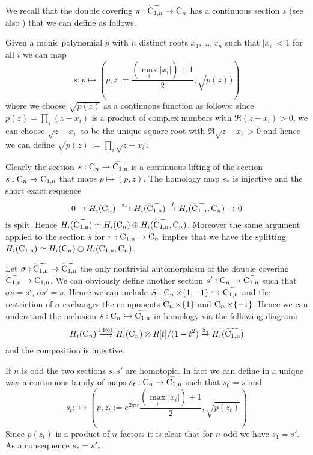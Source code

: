 




We recall that the double covering $\pi: \widetilde{\operatorname{C_{1,n}}} \to \operatorname{C}_n$ has a continuous section $s$  (see also \cite[p. 30]{bianchi}) that we can define as follows.
\begin{df} \label{def:section}
Given a monic polynomial $p$ with $n$ distinct roots $x_1, \ldots, x_n$ such that $|x_i| <1$ for all $i$ we can map
$$s: p \mapsto \left(p, z:= \frac{(\max_i |x_i|) +1}{2}, \sqrt{p(z)}) \right)$$
where we choose $\sqrt{p(z)}$ as a continuous function as follows: since $p(z) = \prod_i(z-x_i)$ is a product of complex numbers with $\Re (z-x_i) >0$, we can choose $\sqrt{z-x_i}$ to be the unique square root with $\Re \sqrt{z-x_i} >0$ and hence we can define $\sqrt{p(z)} := \prod_i \sqrt{z-x_i}$.
\end{df}
Clearly the section $s:\operatorname{C}_n \to \widetilde{\operatorname{C_{1,n}}}$ is a continuous lifting of the section  $\overline{s}:\operatorname{C}_n \to \operatorname{C_{1,n}}$ that maps $p \mapsto (p, z)$.
The homology map $s_*$ is injective and the short exact sequence
$$
0 \to H_i(\operatorname{C}_n) \stackrel{s_*}{\longrightarrow} H_i(\widetilde{\operatorname{C_{1,n}}}) \stackrel{J}{\to} H_i(\widetilde{\operatorname{C_{1,n}}}, \operatorname{C}_n) \to 0
$$
is split. Hence $H_i(\widetilde{\operatorname{C_{1,n}}}) \simeq H_i(\operatorname{C}_n) \oplus H_i(\widetilde{\operatorname{C_{1,n}}}, \operatorname{C}_n)$.
Moreover the same argument applied to the section $\overline{s}$ for $\pi: \operatorname{C_{1,n}} \to \operatorname{C}_n$ implies that we have the splitting $H_i(\operatorname{C_{1,n}}) \simeq H_i(\operatorname{C}_n) \oplus H_i(\operatorname{C_{1,n}}, \operatorname{C}_n)$.	

\begin{rem}\label{rem:Cn_sections}
Let $\sigma: \widetilde{\operatorname{C_{1,n}}} \to \widetilde{\operatorname{C_{1,n}}}$ the only nontrivial automorphism of the double covering $\widetilde{\operatorname{C_{1,n}}} \to \operatorname{C_{1,n}}$.
We can obviously define another section  $s': \operatorname{C}_n \to \widetilde{\operatorname{C_{1,n}}}$ such that $\sigma s = s'$, $\sigma s' = s$.
Hence we can include $S:\operatorname{C}_n \times \{1, -1\} \hookrightarrow \widetilde{\operatorname{C_{1,n}}}$ and the restriction of $\sigma$ exchanges the components $\operatorname{C}_n \times \{1\}$ and $\operatorname{C}_n \times \{-1\}$. Hence we can understand the inclusion $s:\operatorname{C}_n \hookrightarrow \widetilde{\operatorname{C_{1,n}}}$ in homology via the following diagram:
$$
H_i(\operatorname{C}_n) \stackrel{\mathrm{Id} \otimes 1}{\longrightarrow} H_i(\operatorname{C}_n) \otimes R[t]/(1-t^2) \stackrel{S_*}{\to} H_i(\widetilde{\operatorname{C_{1,n}}}) 
$$
and the composition is injective.
\end{rem}

\begin{rem} \label{rem:s_sprime}
If $n$ is odd the two sections $s,s'$ are homotopic. In fact we can define in a unique way a continuous family of maps
$
s_t:\operatorname{C}_n \to \widetilde{\operatorname{C_{1,n}}}
$
such that $s_0 = s$ and
$$
s_t: \mapsto \left(p, z_t:= e^{2\pi i t}\frac{(\max_i |x_i|) +1}{2}, \sqrt{p(z_t)} \right)
$$
Since $p(z_t)$ is a product of $n$ factors it is clear that  for $n$ odd we have $s_1 = s'$.
As a consequence $s_* = s'_*$.\end{rem}

